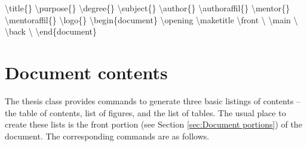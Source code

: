\documentclass[twoside,openany]{thesis}
\begin{document}
{\ttfamily
    \textbackslash title\{<project-title>\}\linebreak
    \textbackslash purpose\{<submission-purpose>\}\linebreak
    \textbackslash degree\{<expected-degree>\}\linebreak
    \textbackslash subject\{<academic-field>\}\linebreak
    \textbackslash author\{<author-name>\}\linebreak
    \textbackslash authoraffil\{<author-affiliation>\}\linebreak
    \textbackslash mentor\{<mentor-name>\}\linebreak
    \textbackslash mentoraffil\{<mentor-affiliation>\}\linebreak
    \textbackslash logo\{<university-logo>\}\linebreak
    \linebreak
    \textbackslash begin\{document\}\linebreak
    \textbackslash opening\linebreak
        \null\quad\textbackslash maketitle\linebreak
    \textbackslash front\linebreak
        \null\quad\textbackslash<front-matter>\linebreak
    \textbackslash main\linebreak
        \null\quad\textbackslash<main-matter>\linebreak
    \textbackslash back\linebreak
        \null\quad\textbackslash<back-matter>\linebreak
    \textbackslash end\{document\}\linebreak
}

\chapter{Document contents}\label{ch:Document contents}

The {\ttfamily thesis} class provides commands to generate three basic listings of contents -- the table of contents, list of figures, and the list of tables.
The usual place to create these lists is the front portion (see Section \ref{sec:Document portions}) of the document.
The corresponding commands are as follows.
\end{document}
